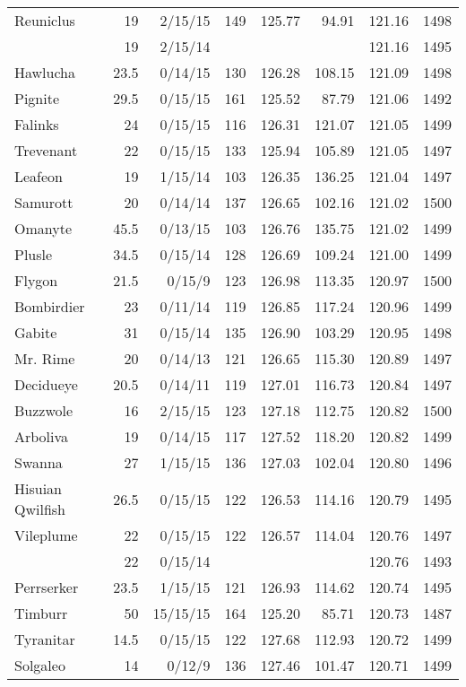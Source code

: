 \begin{longtable}{lrrrrrrr}
Reuniclus & 19 & 2/15/15 & 149 & 125.77 & 94.91 & 121.16 & 1498\\
 & 19 & 2/15/14 & & & & 121.16 & 1495\\
Hawlucha & 23.5 & 0/14/15 & 130 & 126.28 & 108.15 & 121.09 & 1498\\
Pignite & 29.5 & 0/15/15 & 161 & 125.52 & 87.79 & 121.06 & 1492\\
Falinks & 24 & 0/15/15 & 116 & 126.31 & 121.07 & 121.05 & 1499\\
Trevenant & 22 & 0/15/15 & 133 & 125.94 & 105.89 & 121.05 & 1497\\
Leafeon & 19 & 1/15/14 & 103 & 126.35 & 136.25 & 121.04 & 1497\\
Samurott & 20 & 0/14/14 & 137 & 126.65 & 102.16 & 121.02 & 1500\\
Omanyte & 45.5 & 0/13/15 & 103 & 126.76 & 135.75 & 121.02 & 1499\\
Plusle & 34.5 & 0/15/14 & 128 & 126.69 & 109.24 & 121.00 & 1499\\
Flygon & 21.5 & 0/15/9 & 123 & 126.98 & 113.35 & 120.97 & 1500\\
Bombirdier & 23 & 0/11/14 & 119 & 126.85 & 117.24 & 120.96 & 1499\\
Gabite & 31 & 0/15/14 & 135 & 126.90 & 103.29 & 120.95 & 1498\\
Mr. Rime & 20 & 0/14/13 & 121 & 126.65 & 115.30 & 120.89 & 1497\\
Decidueye & 20.5 & 0/14/11 & 119 & 127.01 & 116.73 & 120.84 & 1497\\
Buzzwole & 16 & 2/15/15 & 123 & 127.18 & 112.75 & 120.82 & 1500\\
Arboliva & 19 & 0/14/15 & 117 & 127.52 & 118.20 & 120.82 & 1499\\
Swanna & 27 & 1/15/15 & 136 & 127.03 & 102.04 & 120.80 & 1496\\
Hisuian Qwilfish & 26.5 & 0/15/15 & 122 & 126.53 & 114.16 & 120.79 & 1495\\
Vileplume & 22 & 0/15/15 & 122 & 126.57 & 114.04 & 120.76 & 1497\\
 & 22 & 0/15/14 & & & & 120.76 & 1493\\
Perrserker & 23.5 & 1/15/15 & 121 & 126.93 & 114.62 & 120.74 & 1495\\
Timburr & 50 & 15/15/15 & 164 & 125.20 & 85.71 & 120.73 & 1487\\
Tyranitar & 14.5 & 0/15/15 & 122 & 127.68 & 112.93 & 120.72 & 1499\\
Solgaleo & 14 & 0/12/9 & 136 & 127.46 & 101.47 & 120.71 & 1499\\

\end{longtable}
